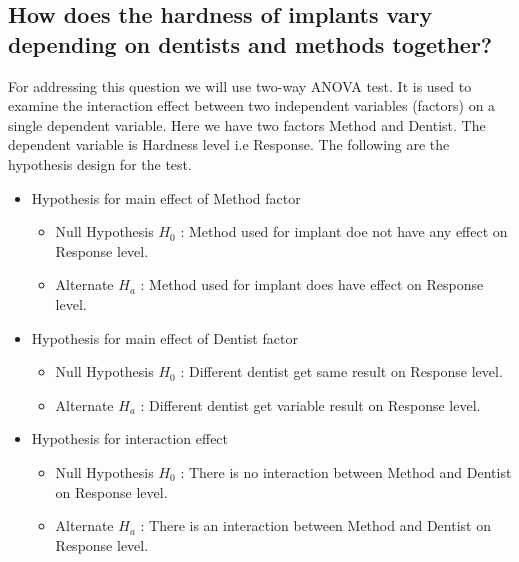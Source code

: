 \documentclass[12pt,a4paper]{style}
\begin{document}
	\subsection{How does the hardness of implants vary depending on dentists and methods together?}
	For addressing this question we will use two-way ANOVA test. It is used to examine the interaction effect between two independent variables (factors) on a single dependent variable. Here we have two factors Method and Dentist. The dependent variable is Hardness level i.e Response. The following are the hypothesis design for the test.
	\begin{itemize}
		\item Hypothesis for main effect of Method factor
		\begin{itemize}
			\item Null Hypothesis $H_0$ : Method used for implant doe not have any effect on Response level. 
			\item Alternate $H_a$ : Method used for implant does have effect on Response level.
		\end{itemize}
	\item Hypothesis for main effect of Dentist factor
		\begin{itemize}
		\item Null Hypothesis $H_0$ : Different dentist get same result on Response level.
		\item Alternate $H_a$ : Different dentist get variable result on Response level.
		\end{itemize}
	\item Hypothesis for interaction effect
	\begin{itemize}
			\item Null Hypothesis $H_0$ : There is no interaction between Method and Dentist on Response level.
		\item Alternate $H_a$ : There is an interaction between Method and Dentist on Response level.
	\end{itemize}
	\end{itemize}
\end{document}
